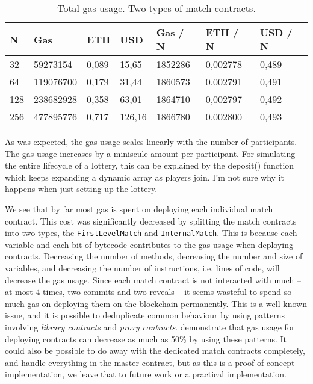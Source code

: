 \begin{table}[h]
\centering
\caption{Total gas usage. Two types of match contracts.}
\begin{tabular}{|l|l|l|l|l|l|l|}
\hline

N & Gas & ETH & USD & Gas / N & ETH / N & USD / N \\ \hline
32 & 59273154 & 0,089 & 15,65 & 1852286 & 0,002778 & 0,489 \\ \hline
64 & 119076700 & 0,179 & 31,44 & 1860573 & 0,002791 & 0,491 \\ \hline
128 & 238682928 & 0,358 & 63,01 & 1864710 & 0,002797 & 0,492 \\ \hline
256 & 477895776 & 0,717 & 126,16 & 1866780 & 0,002800 & 0,493 \\ \hline

\end{tabular}
\end{table}

As was expected, the gas usage scales linearly with the number of participants. The gas usage increases by a miniscule amount per participant. For simulating the entire lifecycle of a lottery, this can be explained by the deposit() function which keeps expanding a dynamic array as players join. I'm not sure why it happens when just setting up the lottery.

We see that by far most gas is spent on deploying each individual match contract. This cost was significantly decreased by splitting the match contracts into two types, the \texttt{FirstLevelMatch} and \texttt{InternalMatch}. This is because each variable and each bit of bytecode contributes to the gas usage when deploying contracts. Decreasing the number of methods, decreasing the number and size of variables, and decreasing the number of instructions, i.e. lines of code, will decrease the gas usage. Since each match contract is not interacted with much – at most 4 times, two commits and two reveals – it seems wasteful to spend so much gas on deploying them on the blockchain permanently. This is a well-known issue, and it is possible to deduplicate common behaviour by using patterns involving \emph{library contracts} and \emph{proxy contracts}. \cite{lu_solidity_2018} demonstrate that gas usage for deploying contracts can decrease as much as 50\% by using these patterns. It could also be possible to do away with the dedicated match contracts completely, and handle everything in the master contract, but as this is a proof-of-concept implementation, we leave that to future work or a practical implementation.

